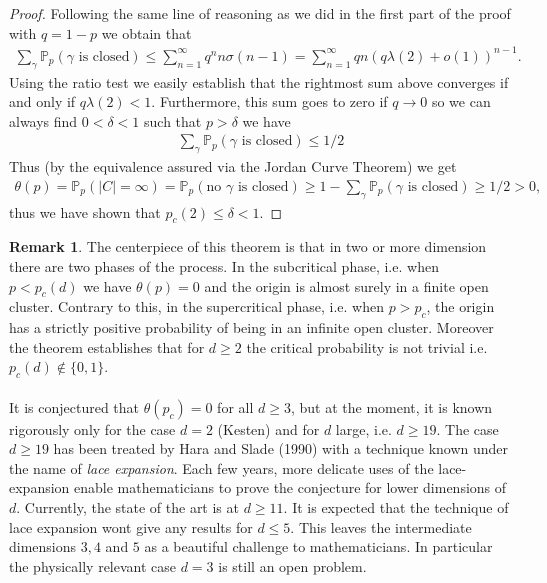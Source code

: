 \documentclass[12pt,a4paper]{article}
\theoremstyle{definition}
\newtheorem{rem}{Remark}[section]
\begin{document}
\begin{proof}
\newpage 
Following the same line of reasoning as we did in the first part of the proof with $q=1-p$ we obtain that 
\begin{align*}
\sum_{ \gamma } \mathbb{P}_p( \gamma \text{ is closed}) \leq \sum_{n=1}^\infty q^n n \sigma(n-1) = \sum_{n=1}^\infty qn( q \lambda(2) + o(1))^{n-1}.
\end{align*}
Using the ratio test we easily establish that the rightmost sum above converges if and only if $q \lambda(2) <1$. Furthermore, this sum goes to zero if $q \to 0$ so we can always find $0 < \delta <1$ such that $p> \delta$ we have 
\begin{align*}
\sum_{ \gamma } \mathbb{P}_p( \gamma \text{ is closed} ) \leq 1/2 
\end{align*}
Thus (by the equivalence assured via the Jordan Curve Theorem) we get 
\begin{align*}
\theta(p) = \mathbb{P}_p(|C|= \infty) = \mathbb{P}_p(\text{no $\gamma$ is closed}) \geq 1 - \sum_{\gamma} \mathbb{P}_p( \gamma \text{ is closed} ) \geq 1/2 >0,
\end{align*}
thus we have shown that $p_c(2) \leq \delta <1$. 
\end{proof}
\begin{rem} The centerpiece of this theorem is that in two or more dimension there are two phases of the process. In the subcritical phase, i.e. when $p < p_c(d)$ we have $\theta(p)=0$ and the origin is almost surely in a finite open cluster. Contrary to this, in the supercritical phase, i.e. when $p>p_c$, the origin has a strictly positive probability of being in an infinite open cluster. Moreover the theorem establishes that for $d \geq 2$ the critical probability is not trivial i.e. $p_c(d) \notin \lbrace 0,1 \rbrace$. 
\\\\
It is conjectured that $\theta(p_c) = 0$ for all $d \geq 3$, but at the moment, it is known rigorously only for the case $d=2$ (Kesten) and for $d$ large, i.e. $d \geq 19$. The case $d \geq 19$ has been treated by Hara and Slade (1990) with a technique known under the name of \textit{lace expansion}. Each few years, more delicate uses of the lace-expansion enable mathematicians to prove the conjecture for lower dimensions of $d$. Currently, the state of the art is at $d \geq 11$. It is expected that the technique of lace expansion wont give any results for $d \leq 5$. This leaves the intermediate dimensions $3,4$ and $5$ as a beautiful challenge to mathematicians. In particular the physically relevant case $d=3$ is still an open problem. 
\end{rem}
\newpage
\end{document}
